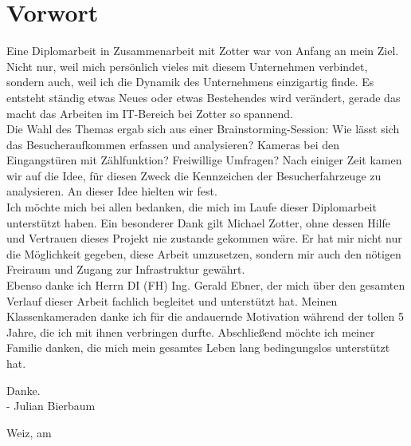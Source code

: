 \section*{Vorwort}
Eine Diplomarbeit in Zusammenarbeit mit Zotter war von Anfang an mein Ziel. 
Nicht nur, weil mich persönlich vieles mit diesem Unternehmen verbindet, sondern auch, weil ich die Dynamik des Unternehmens einzigartig finde.
Es entsteht ständig etwas Neues oder etwas Bestehendes wird verändert, gerade das macht das Arbeiten im IT-Bereich bei Zotter so spannend. \\
Die Wahl des Themas ergab sich aus einer Brainstorming-Session: Wie lässt sich das Besucheraufkommen erfassen und analysieren? Kameras bei den Eingangstüren mit Zählfunktion? Freiwillige Umfragen?
Nach einiger Zeit kamen wir auf die Idee, für diesen Zweck die Kennzeichen der Besucherfahrzeuge zu analysieren. An dieser Idee hielten wir fest. \\
Ich möchte mich bei allen bedanken, die mich im Laufe dieser Diplomarbeit unterstützt haben.
Ein besonderer Dank gilt Michael Zotter, ohne dessen Hilfe und Vertrauen dieses Projekt nie zustande gekommen wäre. 
Er hat mir nicht nur die Möglichkeit gegeben, diese Arbeit umzusetzen, sondern mir auch den nötigen Freiraum und Zugang zur Infrastruktur gewährt. \\
Ebenso danke ich Herrn DI (FH) Ing. Gerald Ebner, der mich über den gesamten Verlauf dieser Arbeit fachlich begleitet und unterstützt hat.
Meinen Klassenkameraden danke ich für die andauernde Motivation während der tollen 5 Jahre, die ich mit ihnen verbringen durfte.
Abschließend möchte ich meiner Familie danken, die mich mein gesamtes Leben lang bedingungslos unterstützt hat.

\vspace{1.5cm}

Danke. \\
- Julian Bierbaum

\vspace{0.5cm}

Weiz, am \ADatum 

\newpage
\newpage

\setlength{\headsep }{1.2cm}
\setlength{\voffset}{1.0cm}


\tableofcontents
